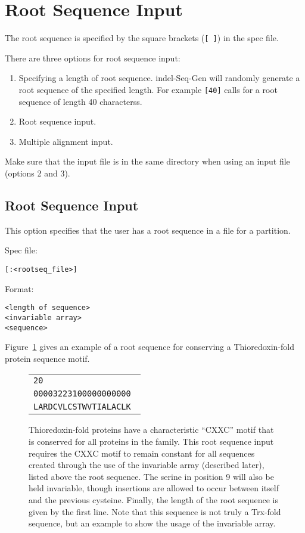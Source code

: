 \documentclass[10pt]{article}
\begin{document}
\section{Root Sequence Input}
\label{sec:root}

The root sequence is specified by the square brackets ({\tt [ ]}) in the spec file.  

There are three options for root sequence input:
\begin{enumerate}
\item Specifying a length of root sequence. indel-Seq-Gen will randomly generate a root 
sequence of the specified length.  For example {\tt [40]} calls for a root sequence of length 
40 characterss.
\item Root sequence input.
\item Multiple alignment input.
\end{enumerate}

Make sure that the input file is in the same directory when using an input file (options 2 
and 3).

\subsection{Root Sequence Input}

This option specifies that the user has a root sequence in a file for a partition.  

Spec file:
\begin{verbatim}
[:<rootseq_file>]
\end{verbatim}

Format:
\begin{verbatim}
<length of sequence>
<invariable array>
<sequence>
\end{verbatim}

Figure~\ref{fig:trx} gives an example of a root sequence for conserving a Thioredoxin-fold 
protein sequence motif.

\begin{figure}[btph]
 \centering
  \begin{tabular}{|l|}
  \hline
  \texttt{20} \\
  \texttt{00003223100000000000 } \\
  \texttt{LARDCVLCSTWVTIALACLK } \\
  \hline
  \end{tabular}
\caption{Thioredoxin-fold proteins have a characteristic ``CXXC'' motif that is conserved for 
all proteins in the family.  This root sequence input requires the CXXC motif to remain 
constant for all sequences created through the use of the invariable array (described later), 
listed above the root sequence. The serine in position 9 will also be held invariable, though 
insertions are allowed to occur between itself and the previous cysteine.  Finally, the length 
of the root sequence is given by the first line. Note that this sequence is not truly a 
Trx-fold sequence, but an example to show the usage of the invariable array.}
\label{fig:trx}
\end{figure}
\end{document}
